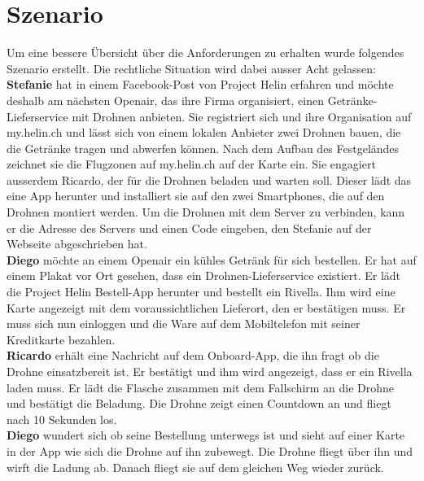 \section{Szenario}

Um eine bessere Übersicht über die Anforderungen zu erhalten wurde folgendes Szenario erstellt. Die rechtliche Situation wird dabei ausser Acht gelassen:\\

\textbf{Stefanie} hat in einem Facebook-Post von Project Helin erfahren und möchte deshalb am nächsten Openair, das ihre Firma organisiert, einen Getränke-Lieferservice mit Drohnen anbieten. Sie registriert sich und ihre Organisation auf my.helin.ch und lässt sich von einem lokalen Anbieter zwei Drohnen bauen, die die Getränke tragen und abwerfen können. Nach dem Aufbau des Festgeländes zeichnet sie die Flugzonen auf my.helin.ch auf der Karte ein. Sie engagiert ausserdem Ricardo, der für die Drohnen beladen und warten soll. Dieser lädt das eine App herunter und installiert sie auf den zwei Smartphones, die auf den Drohnen montiert werden. Um die Drohnen mit dem Server zu verbinden, kann er die Adresse des Servers und einen Code eingeben, den Stefanie auf der Webseite abgeschrieben hat.\\

\textbf{Diego} möchte an einem Openair ein kühles Getränk für sich bestellen. Er hat auf einem Plakat vor Ort gesehen, dass ein Drohnen-Lieferservice existiert. Er lädt die Project Helin Bestell-App herunter und bestellt ein Rivella. Ihm wird eine Karte angezeigt mit dem voraussichtlichen Lieferort, den er bestätigen muss. Er muss sich nun einloggen und die Ware auf dem Mobiltelefon mit seiner Kreditkarte bezahlen.\\

\textbf{Ricardo} erhält eine Nachricht auf dem Onboard-App, die ihn fragt ob die Drohne einsatzbereit ist. Er bestätigt und ihm wird angezeigt, dass er ein Rivella laden muss. Er lädt die Flasche zusammen mit dem Fallschirm an die Drohne und bestätigt die Beladung. Die Drohne zeigt einen Countdown an und fliegt nach 10 Sekunden los. \\

\textbf{Diego} wundert sich ob seine Bestellung unterwegs ist und sieht auf einer Karte in der App wie sich die Drohne auf ihn zubewegt. Die Drohne fliegt über ihn und wirft die Ladung ab. Danach fliegt sie auf dem gleichen Weg wieder zurück.\\

